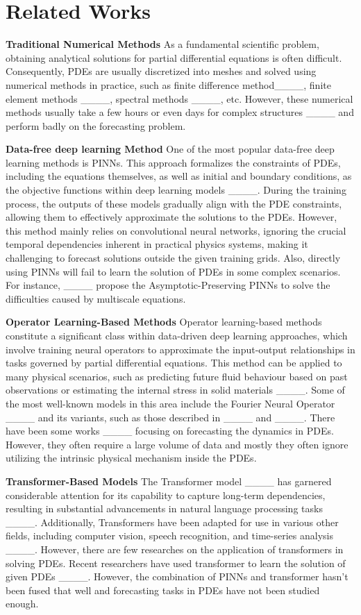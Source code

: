 \section{Related Works}
\label{sec: related_works}
\textbf{Traditional Numerical Methods} As a fundamental scientific problem, obtaining analytical solutions for partial differential equations is often difficult. Consequently, PDEs are usually discretized into meshes and solved using numerical methods in practice, such as finite difference method____, finite element methods ____, spectral methods ____, etc. However, these numerical methods usually take a few hours or even days for complex structures ____ and perform badly on the forecasting problem.

\textbf{Data-free deep learning Method} One of the most popular data-free deep learning methods is PINNs. This approach formalizes the constraints of PDEs, including the equations themselves, as well as initial and boundary conditions, as the objective functions within deep learning models ____. During the training process, the outputs of these models gradually align with the PDE constraints, allowing them to effectively approximate the solutions to the PDEs. However, this method mainly relies
on convolutional neural networks, ignoring the crucial temporal dependencies inherent in practical physics systems, making it challenging to forecast solutions outside the given training grids. Also, directly using PINNs will fail to learn the solution of PDEs in some complex scenarios. For instance, ____ propose the Asymptotic-Preserving PINNs to solve the difficulties caused by multiscale equations.

\textbf{Operator Learning-Based Methods} 
Operator learning-based methods constitute a significant class within data-driven deep learning approaches, which involve training neural operators to approximate the input-output relationships in tasks governed by partial differential equations. This method can be applied to many physical scenarios, such as predicting future fluid behaviour based on past observations or estimating the internal stress in solid materials ____. Some of the most well-known models in this area include the Fourier Neural Operator ____ and its variants, such as those described in  ____ and ____. There have been some works ____ focusing on forecasting the dynamics in PDEs. However, they often require a large volume of data and mostly they often ignore utilizing the intrinsic physical mechanism inside the PDEs.

\textbf{Transformer-Based Models}
The Transformer model ____ has garnered considerable attention for its capability to capture long-term dependencies, resulting in substantial advancements in natural language processing tasks ____. Additionally, Transformers have been adapted for use in various other fields, including computer vision, speech recognition, and time-series analysis ____. However, there are few researches on the application of transformers in solving PDEs. Recent researchers have used transformer to learn the solution of given PDEs ____. However, the combination of PINNs and transformer hasn't been fused that well and forecasting tasks in PDEs have not been studied enough.
